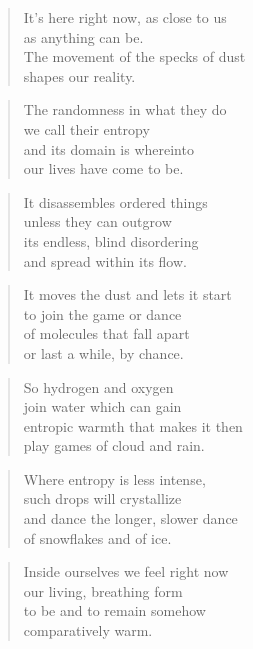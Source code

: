 \documentclass[14pt,a4paper]{article}
\begin{document}
\begin{verse}
It’s here right now, as close to us\\
as anything can be.\\
The movement of the specks of dust\\
shapes our reality.
\end{verse}

\begin{verse}
The randomness in what they do\\
we call their entropy\\
and its domain is whereinto\\
our lives have come to be.
\end{verse}

\begin{verse}
It disassembles ordered things\\
unless they can outgrow\\
its endless, blind disordering\\
and spread within its flow.
\end{verse}

\begin{verse}
It moves the dust and lets it start\\
to join the game or dance\\
of molecules that fall apart\\
or last a while, by chance.
\end{verse}

\begin{verse}
So hydrogen and oxygen\\
join water which can gain\\
entropic warmth that makes it then\\
play games of cloud and rain.
\end{verse}

\begin{verse}
Where entropy is less intense,\\
such drops will crystallize\\
and dance the longer, slower dance\\
of snowflakes and of ice.
\end{verse}

\begin{verse}
Inside ourselves we feel right now\\
our living, breathing form\\
to be and to remain somehow\\
comparatively warm.
\end{verse}
\end{document}
